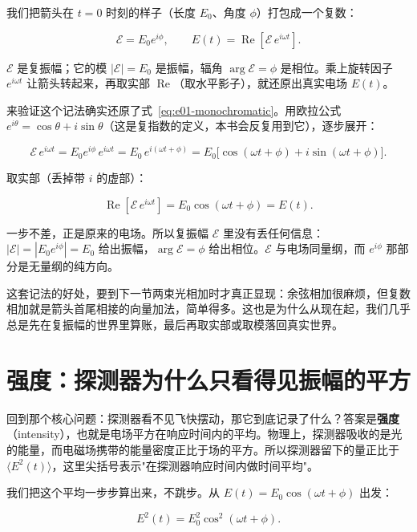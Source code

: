 我们把箭头在 \(t=0\) 时刻的样子（长度 \(E_0\)、角度 \(\phi\)）打包成一个复数：

\begin{equation}
  \mathcal{E}=E_0e^{i\phi},\qquad E(t)=\operatorname{Re}\!\left[\mathcal{E}\,e^{i\omega t}\right].
  \label{eq:e01-phasor}
\end{equation}
\begin{formulaexplain}
\(\mathcal E\) 是复振幅；它的模 \(|\mathcal E|=E_0\) 是振幅，辐角 \(\arg\mathcal E=\phi\) 是相位。乘上旋转因子 \(e^{i\omega t}\) 让箭头转起来，再取实部 \(\operatorname{Re}\)（取水平影子），就还原出真实电场 \(E(t)\)。
\end{formulaexplain}

来验证这个记法确实还原了式~\eqref{eq:e01-monochromatic}。用欧拉公式 \(e^{i\theta}=\cos\theta+i\sin\theta\)（这是复指数的定义，本书会反复用到它），逐步展开：

\[
  \mathcal{E}\,e^{i\omega t}
  =E_0e^{i\phi}\,e^{i\omega t}
  =E_0\,e^{i(\omega t+\phi)}
  =E_0\bigl[\cos(\omega t+\phi)+i\sin(\omega t+\phi)\bigr].
\]

取实部（丢掉带 \(i\) 的虚部）：

\[
  \operatorname{Re}\!\left[\mathcal{E}\,e^{i\omega t}\right]
  =E_0\cos(\omega t+\phi)=E(t).
\]

一步不差，正是原来的电场。所以复振幅 \(\mathcal E\) 里没有丢任何信息：\(|\mathcal E|=|E_0e^{i\phi}|=E_0\) 给出振幅，\(\arg\mathcal E=\phi\) 给出相位。\(\mathcal E\) 与电场同量纲，而 \(e^{i\phi}\) 那部分是无量纲的纯方向。

这套记法的好处，要到下一节两束光相加时才真正显现：余弦相加很麻烦，但复数相加就是箭头首尾相接的向量加法，简单得多。这也是为什么从现在起，我们几乎总是先在复振幅的世界里算账，最后再取实部或取模落回真实世界。

\section{强度：探测器为什么只看得见振幅的平方}
\label{sec:e01-intensity}

回到那个核心问题：探测器看不见飞快摆动，那它到底记录了什么？答案是\textbf{强度}（intensity），也就是电场平方在响应时间内的平均。物理上，探测器吸收的是光的能量，而电磁场携带的能量密度正比于场的平方。所以探测器留下的量正比于 \(\langle E^2(t)\rangle\)，这里尖括号表示"在探测器响应时间内做时间平均"。

我们把这个平均一步步算出来，不跳步。从 \(E(t)=E_0\cos(\omega t+\phi)\) 出发：

\[
  E^2(t)=E_0^2\cos^2(\omega t+\phi).
\]


